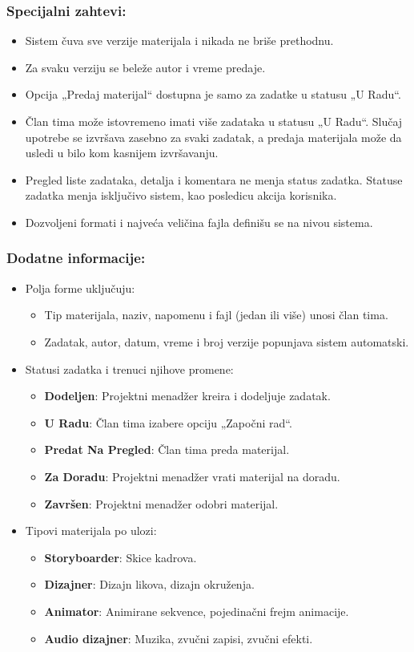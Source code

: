 \subsubsection*{Specijalni zahtevi:}
\begin{itemize}
	\item Sistem čuva sve verzije materijala i nikada ne briše prethodnu.
	\item Za svaku verziju se beleže autor i vreme predaje.
	\item Opcija „Predaj materijal“ dostupna je samo za zadatke u statusu „U Radu“.
	\item Član tima može istovremeno imati više zadataka u statusu „U Radu“. Slučaj upotrebe se izvršava zasebno za svaki zadatak, a predaja materijala može da usledi u bilo kom kasnijem izvršavanju.
	\item Pregled liste zadataka, detalja i komentara ne menja status zadatka. Statuse zadatka menja isključivo sistem, kao posledicu akcija korisnika.
	\item Dozvoljeni formati i najveća veličina fajla definišu se na nivou sistema.
\end{itemize}

\subsubsection*{Dodatne informacije:}
\begin{itemize}
	\item Polja forme uključuju:
	\begin{itemize}
		\item Tip materijala, naziv, napomenu i fajl (jedan ili više) unosi član tima.
		\item Zadatak, autor, datum, vreme i broj verzije popunjava sistem automatski.
	\end{itemize}
	\item Statusi zadatka i trenuci njihove promene:
	\begin{itemize}
		\item \textbf{Dodeljen}: Projektni menadžer kreira i dodeljuje zadatak.
		\item \textbf{U Radu}: Član tima izabere opciju „Započni rad“.
		\item \textbf{Predat Na Pregled}: Član tima preda materijal.
		\item \textbf{Za Doradu}: Projektni menadžer vrati materijal na doradu.
		\item \textbf{Završen}: Projektni menadžer odobri materijal.
	\end{itemize}
	\item Tipovi materijala po ulozi:
	\begin{itemize}
		\item \textbf{Storyboarder}: Skice kadrova.
		\item \textbf{Dizajner}: Dizajn likova, dizajn okruženja.
		\item \textbf{Animator}: Animirane sekvence, pojedinačni frejm animacije.
		\item \textbf{Audio dizajner}: Muzika, zvučni zapisi, zvučni efekti.
	\end{itemize}
\end{itemize}

